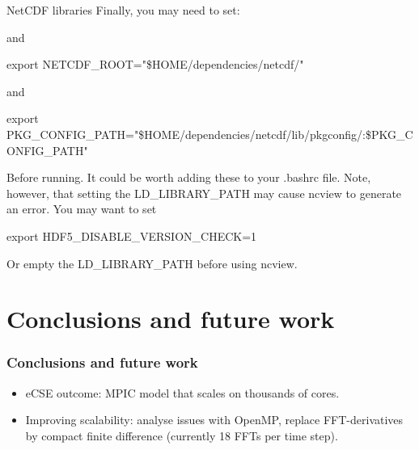 \documentclass{beamer}
\newenvironment{Shaded}{}{}
\newcommand{\StringTok}[1]{\textcolor[rgb]{0.31,0.60,0.02}{{#1}}}
\newcommand{\VariableTok}[1]{\textcolor[rgb]{0.00,0.00,0.00}{{#1}}}
\newcommand{\BuiltInTok}[1]{{#1}}
\newcommand{\NormalTok}[1]{{#1}}
\begin{document}
\begin{frame}[fragile]{NetCDF libraries}
Finally, you may need to set:

\begin{Shaded}
\end{Shaded}

and

\begin{Shaded}
\begin{Highlighting}[]
\BuiltInTok{export} \VariableTok{NETCDF_ROOT=}\StringTok{"}\VariableTok{\$HOME}\StringTok{/dependencies/netcdf/"}
\end{Highlighting}
\end{Shaded}

and

\begin{Shaded}
\begin{Highlighting}[]
\BuiltInTok{export} \VariableTok{PKG_CONFIG_PATH=}\StringTok{"}\VariableTok{\$HOME}\StringTok{/dependencies/netcdf/lib/pkgconfig/:}\VariableTok{\$PKG_CONFIG_PATH}\StringTok{"}
\end{Highlighting}
\end{Shaded}

Before running. It could be worth adding these to your .bashrc file.
Note, however, that setting the LD\_LIBRARY\_PATH may cause ncview to
generate an error. You may want to set

\begin{Shaded}
\begin{Highlighting}[]
\BuiltInTok{export} \VariableTok{HDF5_DISABLE_VERSION_CHECK=}\NormalTok{1}
\end{Highlighting}
\end{Shaded}

Or empty the LD\_LIBRARY\_PATH before using ncview.

\end{frame}

\section{Conclusions and future work}

\begin{frame}
\frametitle{Conclusions and future work}

\begin{itemize}
\item eCSE outcome: MPIC model that scales on thousands of cores.
\item Improving scalability: analyse issues with OpenMP, replace FFT-derivatives by compact finite difference (currently 18 FFTs per time step).  
\end{itemize}

\end{frame}
\end{document}
